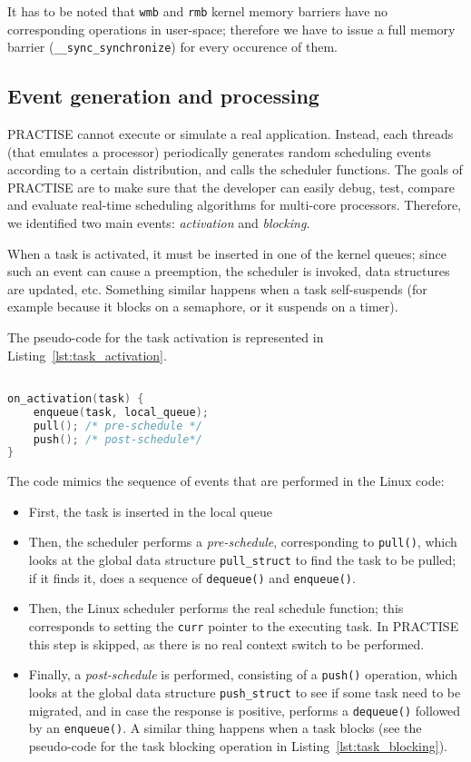 It has to be noted that \texttt{wmb} and \texttt{rmb} kernel memory barriers have no corresponding operations
in user-space; therefore we have to issue a full memory barrier (\texttt{\_\_sync\_synchronize}) for every
occurence of them.

\subsection{Event generation and processing\label{sec:PRACTISE_event_gen}}
PRACTISE cannot execute or simulate a real application. Instead, each threads (that emulates a processor)
periodically generates random scheduling events according to a certain distribution, and calls the scheduler
functions. The goals of PRACTISE are to make sure that the developer can easily debug, test, compare and
evaluate real-time scheduling algorithms for multi-core processors. Therefore, we identified two main
events: \emph{activation} and \emph{blocking}.

When a task is activated, it must be inserted in one of the 
kernel queues; since such an event can cause a preemption, the scheduler is invoked, data structures are
updated, etc. Something similar happens when a task self-suspends (for example because it blocks on a
semaphore, or it suspends on a timer).

The pseudo-code for the task activation is represented in Listing~\ref{lst:task_activation}.

\begin{lstlisting}[language=C, caption={Task activation pseudo-code},
                        label={lst:task_activation}]

on_activation(task) {
	enqueue(task, local_queue);
	pull();	/* pre-schedule */
	push();	/* post-schedule*/
}

\end{lstlisting} 

The code mimics the sequence of events that are performed in the Linux code:

\begin{itemize}
\item First, the task is inserted in the local queue
\item Then, the scheduler performs a \emph{pre-schedule}, corresponding to \texttt{pull()}, which looks
at the global data structure \texttt{pull\_struct} to find the task to be pulled; if it finds it, does
a sequence of \texttt{dequeue()} and \texttt{enqueue()}.
\item Then, the Linux scheduler performs the real schedule function; this corresponds to setting the
\texttt{curr} pointer to the executing task. In PRACTISE this step is skipped, as there is no real
context switch to be performed.
\item Finally, a \emph{post-schedule} is performed, consisting of a \texttt{push()} operation, which
looks at the global data structure \texttt{push\_struct} to see if some task need to be migrated, and
in case the response is positive, performs a \texttt{dequeue()} followed by an \texttt{enqueue()}.
A similar thing happens when a task blocks (see the pseudo-code for the task blocking operation
in Listing~\ref{lst:task_blocking}).
\end{itemize}

